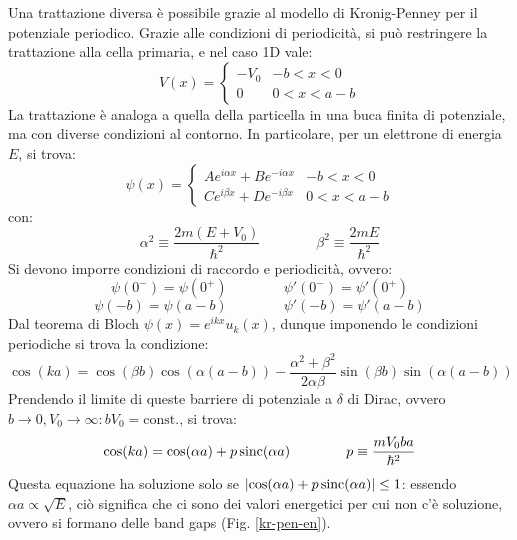 Una trattazione diversa è possibile grazie al modello di Kronig-Penney per il potenziale periodico. Grazie alle condizioni di periodicità, si può restringere la trattazione alla cella primaria, e nel caso 1D vale:
\begin{equation}
	V(x) =
	\begin{cases}
		-V_0 & -b < x < 0 \\
		0 & 0 < x < a-b
	\end{cases}
\end{equation}
La trattazione è analoga a quella della particella in una buca finita di potenziale, ma con diverse condizioni al contorno. In particolare, per un elettrone di energia $ E $, si trova:
\begin{equation}
	\psi(x) =
	\begin{cases}
		A e^{i \alpha x} + B e^{-i \alpha x} & -b < x < 0 \\
		C e^{i \beta x} + D e^{-i \beta x} & 0 < x < a-b
	\end{cases}
\end{equation}
con:
\begin{equation}
	\alpha^2 \equiv \frac{2m (E + V_0)}{\hbar^2}
	\qquad \qquad
	\beta^2 \equiv \frac{2m E}{\hbar^2}
\end{equation}
Si devono imporre condizioni di raccordo e periodicità, ovvero:
\begin{equation}
	\psi(0^-) = \psi(0^+)
	\qquad \qquad
	\psi'(0^-) = \psi'(0^+)
\end{equation}
\begin{equation}
	\psi(-b) = \psi(a-b)
	\qquad \qquad
	\psi'(-b) = \psi'(a-b)
\end{equation}
Dal teorema di Bloch $ \psi(x) = e^{ikx} u_k(x) $, dunque imponendo le condizioni periodiche si trova la condizione:
\begin{equation}
	\cos (ka) = \cos(\beta b) \cos (\alpha(a-b)) - \frac{\alpha^2 + \beta^2}{2\alpha \beta} \sin(\beta b) \sin(\alpha (a-b))
\end{equation}
Prendendo il limite di queste barriere di potenziale a $ \delta $ di Dirac, ovvero $ b \rightarrow 0 , V_0 \rightarrow \infty : bV_0 = \text{const.} $, si trova:
\begin{equation}
	\cos(ka) = \cos(\alpha a) + p \operatorname{sinc}(\alpha a)
	\qquad \qquad
	p \equiv \frac{m V_0 ba}{\hbar^2}
\end{equation}
Questa equazione ha soluzione solo se $ \left\lvert\cos(\alpha a) + p \operatorname{sinc}(\alpha a)\right\rvert \le 1 $: essendo $ \alpha a \propto \sqrt{E} $, ciò significa che ci sono dei valori energetici per cui non c'è soluzione, ovvero si formano delle band gaps (Fig. \ref{kr-pen-en}).

